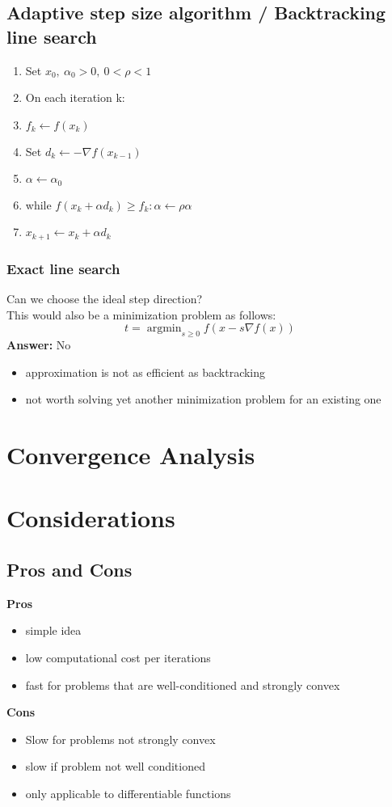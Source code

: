 \documentclass{article}
\theoremstyle{definition}
\theoremstyle{remark}
\newcommand{\argmin}{\mathop{\mathrm{argmin}}}
\newcommand{\tab}[1][1cm]{\hspace*{#1}}
\begin{document}
\subsection{Adaptive step size algorithm / Backtracking line search}
\begin{enumerate}
    \item{}Set $x_0,\ \alpha_{0} > 0,\ 0 < \rho < 1$
    \item{}On each iteration k:
    \item{}\tab $f_k \leftarrow f(x_k)$
    \item{}\tab Set $d_k \leftarrow -\nabla f(x_{k-1})$
    \item{}\tab $\alpha \leftarrow \alpha_0$
    \item{}\tab while $f(x_k + \alpha d_k) \geq f_k: \alpha \leftarrow \rho \alpha$
    \item{}\tab $x_{k+1} \leftarrow x_k + \alpha d_k$
\end{enumerate}

\subsubsection{Exact line search}
Can we choose the ideal step direction?\\
This would also be a minimization problem as follows:
$$t = \argmin_{s \geq 0} f(x - s\nabla f(x))$$
\textbf{Answer: } No
\begin{itemize}
    \item approximation is not as efficient as backtracking
    \item not worth solving yet another minimization problem for an existing one
\end{itemize}

\section{Convergence Analysis}

\section{Considerations}
\subsection{Pros and Cons}
\textbf{Pros}
\begin{itemize}
    \item simple idea
    \item low computational cost per iterations
    \item fast for problems that are well-conditioned and strongly convex
\end{itemize}
\textbf{Cons}
\begin{itemize}
    \item Slow for problems not strongly convex
    \item slow if problem not well conditioned
    \item only applicable to differentiable functions
\end{itemize}
\end{document}
